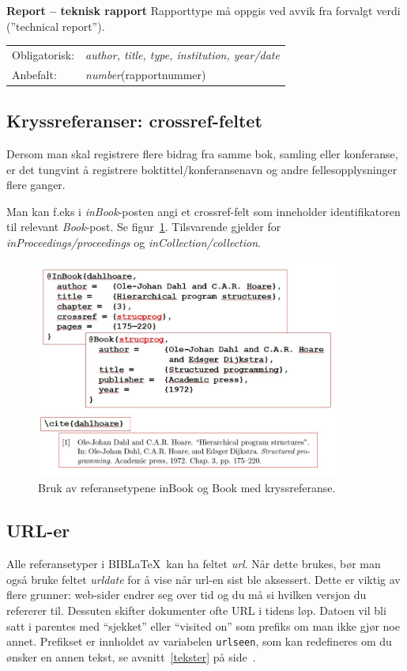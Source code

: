 \documentclass[11pt,norsk,a4paper]{article}
\newcommand{\bt}{BibTeX{}}
\newcommand{\blt}{B{\smaller[2]IB}\discretionary{-}{}{\kern
    -0.12em}\LaTeX{}}
\newcommand{\underskrift}[1]{\vspace{.2cm}\noindent\textbf{#1}\newline}
\newcommand{\flipp}{\vspace{0.1cm}\newline\indent}
\newcommand{\mnd}{Obligatorisk}
\begin{document}
\underskrift{Report -- teknisk rapport}
Rapporttype må oppgis ved avvik fra forvalgt verdi (''technical
report'').
\flipp\begin{tabular}{ll}
\mnd:&\textit{author, title, type, institution, year/date}\\
Anbefalt: & \textit{number}(rapportnummer)\\ 
\end{tabular}

\subsection{Kryssreferanser: crossref-feltet} 
Dersom man skal registrere flere bidrag fra samme bok, samling eller
konferanse, er det tungvint å registrere boktittel/konferansenavn og
andre fellesopplysninger flere ganger.

Man kan f.eks i \textit{inBook}-posten angi et crossref-felt som
inneholder identifikatoren til relevant \textit{Book}-post. Se
figur~\ref{crossref}. Tilsvarende gjelder for
\textit{inProceedings/proceedings} og
\textit{inCollection/collection}.

\begin{figure}
\begin{center}
\includegraphics[width=10cm]{./chapterinbook.jpg}
\caption{Bruk av referansetypene inBook og Book med
  kryssreferanse.}\label{crossref}
\end{center}
\end{figure}

\subsection{URL-er}\label{biblatex-url}
Alle referansetyper i \blt\ kan ha feltet \textit{url}. Når dette
brukes, bør man også bruke feltet \textit{urldate} for å vise når
url-en sist ble aksessert. Dette er viktig av flere grunner:
web-sider endrer seg over tid og du må si hvilken versjon du refererer
til. Dessuten skifter dokumenter ofte URL i tidens løp.
Datoen vil bli satt i parentes med ``sjekket'' eller ``visited on''
som prefiks om man ikke gjør noe annet. Prefikset er innholdet av
variabelen \texttt{urlseen}, som kan redefineres om du ønsker en annen
tekst, se avsnitt~\ref{tekster} på side~\pageref{tekster}.
\end{document}

